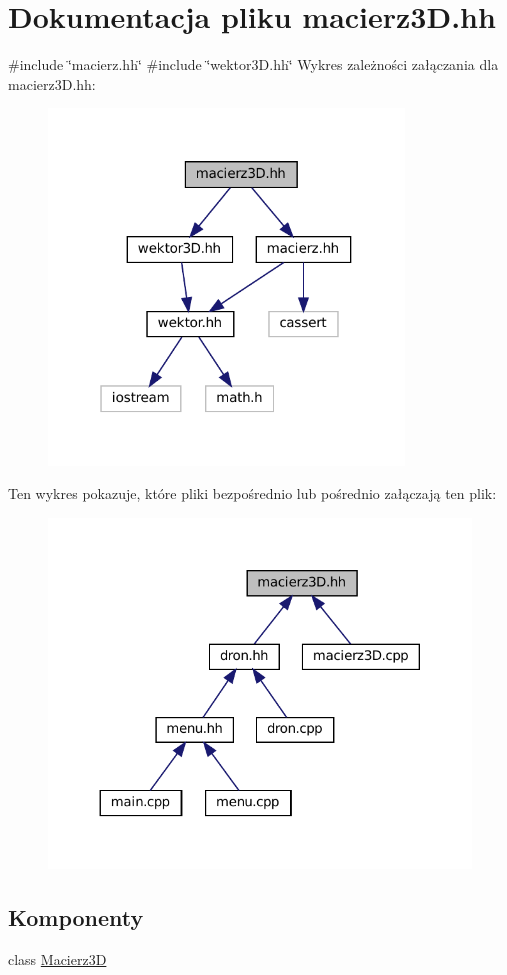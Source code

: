 \hypertarget{macierz3_d_8hh}{}\section{Dokumentacja pliku macierz3\+D.\+hh}
\label{macierz3_d_8hh}
{\ttfamily \#include \char`\"{}macierz.\+hh\char`\"{}}\newline
{\ttfamily \#include \char`\"{}wektor3\+D.\+hh\char`\"{}}\newline
Wykres zależności załączania dla macierz3\+D.\+hh\+:\nopagebreak
\begin{figure}[H]
\begin{center}
\leavevmode
\includegraphics[width=268pt]{macierz3_d_8hh__incl}
\end{center}
\end{figure}
Ten wykres pokazuje, które pliki bezpośrednio lub pośrednio załączają ten plik\+:\nopagebreak
\begin{figure}[H]
\begin{center}
\leavevmode
\includegraphics[width=324pt]{macierz3_d_8hh__dep__incl}
\end{center}
\end{figure}
\subsection*{Komponenty}
\begin{DoxyCompactItemize}
\item 
class \mbox{\hyperlink{class_macierz3_d}{Macierz3D}}
\end{DoxyCompactItemize}
